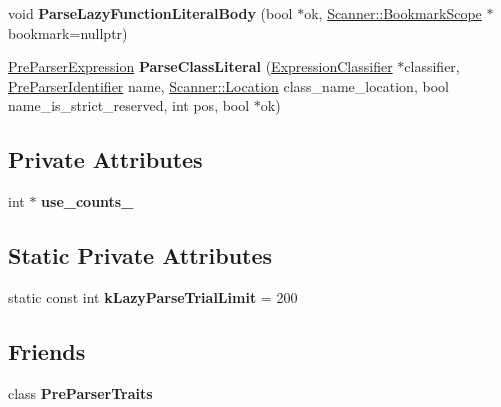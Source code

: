 \begin{DoxyCompactItemize}
\item 
void {\bfseries Parse\+Lazy\+Function\+Literal\+Body} (bool $\ast$ok, \hyperlink{classv8_1_1internal_1_1_scanner_1_1_bookmark_scope}{Scanner\+::\+Bookmark\+Scope} $\ast$bookmark=nullptr)\hypertarget{classv8_1_1internal_1_1_pre_parser_ad21330897f1503fc611f8e19a6245d9a}{}\label{classv8_1_1internal_1_1_pre_parser_ad21330897f1503fc611f8e19a6245d9a}

\item 
\hyperlink{classv8_1_1internal_1_1_pre_parser_expression}{Pre\+Parser\+Expression} {\bfseries Parse\+Class\+Literal} (\hyperlink{classv8_1_1internal_1_1_expression_classifier}{Expression\+Classifier} $\ast$classifier, \hyperlink{classv8_1_1internal_1_1_pre_parser_identifier}{Pre\+Parser\+Identifier} name, \hyperlink{structv8_1_1internal_1_1_scanner_1_1_location}{Scanner\+::\+Location} class\+\_\+name\+\_\+location, bool name\+\_\+is\+\_\+strict\+\_\+reserved, int pos, bool $\ast$ok)\hypertarget{classv8_1_1internal_1_1_pre_parser_a2f0fd5ba0db2d57329515a55e45cafab}{}\label{classv8_1_1internal_1_1_pre_parser_a2f0fd5ba0db2d57329515a55e45cafab}

\end{DoxyCompactItemize}
\subsection*{Private Attributes}
\begin{DoxyCompactItemize}
\item 
int $\ast$ {\bfseries use\+\_\+counts\+\_\+}\hypertarget{classv8_1_1internal_1_1_pre_parser_a8ac2620ec7dcc280c3dcd6f2b8b1b9c4}{}\label{classv8_1_1internal_1_1_pre_parser_a8ac2620ec7dcc280c3dcd6f2b8b1b9c4}

\end{DoxyCompactItemize}
\subsection*{Static Private Attributes}
\begin{DoxyCompactItemize}
\item 
static const int {\bfseries k\+Lazy\+Parse\+Trial\+Limit} = 200\hypertarget{classv8_1_1internal_1_1_pre_parser_aac2bbdc013cc8980a9a2d4372265fecc}{}\label{classv8_1_1internal_1_1_pre_parser_aac2bbdc013cc8980a9a2d4372265fecc}

\end{DoxyCompactItemize}
\subsection*{Friends}
\begin{DoxyCompactItemize}
\item 
class {\bfseries Pre\+Parser\+Traits}\hypertarget{classv8_1_1internal_1_1_pre_parser_a13cc2d699d49f893ee3824107270498e}{}\label{classv8_1_1internal_1_1_pre_parser_a13cc2d699d49f893ee3824107270498e}

\end{DoxyCompactItemize}

